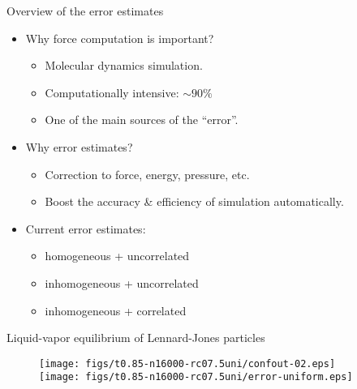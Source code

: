 \documentclass{beamer}
\newcommand{\redc}[1]{{\color{red} #1}}
\newcommand{\bluec}[1]{{\color{blue} #1}}
\newcommand{\tickYes}{\checkmark}
\begin{document}
\begin{frame}{Overview of the error estimates}
  \begin{itemize}
    \vfill
  \item <1-> Why force computation is important?
    \begin{itemize}\itemsep 3pt
    \item Molecular dynamics simulation.
    \item Computationally intensive: \redc{$ \sim 90 \%$}
    \item One of the main sources of the \redc{``error''}.
    \end{itemize}
    \vfill
  \item<2-> Why error estimates?
    \begin{itemize}\itemsep 3pt
    \item Correction to \redc{force, energy, pressure, etc.}
    \item Boost the \redc{accuracy \& efficiency} of simulation automatically.
    \end{itemize}
    \vfill
  \item<3->   Current error estimates:
    \begin{itemize}\itemsep 3pt
    \item <3-> homogeneous  + uncorrelated \quad \bluec{\tickYes\:$\mathcal O(1)$}
    \item <4-> inhomogeneous  + uncorrelated \quad \redc{\tickYes\:$\mathcal O(N\log N)$}
    \item <4-> inhomogeneous  + correlated \quad \redc{\tickYes\:$\mathcal O(N^2\log N) \rightarrow \mathcal O(N\log N)$}
    \end{itemize}
    \vfill
  \end{itemize}
\end{frame}


\begin{frame}{Liquid-vapor equilibrium of Lennard-Jones particles}
  \begin{figure}
    \centering
    \texttt{[image: figs/t0.85-n16000-rc07.5uni/confout-02.eps]}\\
    \texttt{[image: figs/t0.85-n16000-rc07.5uni/error-uniform.eps]}
  \end{figure}
\end{frame}
\end{document}
